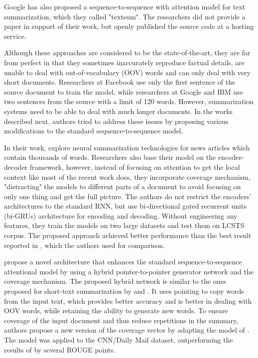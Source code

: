 \documentclass[11pt,a4paper,onecolumn]{article}
\begin{document}
Google has also proposed a sequence-to-sequence with attention model for text summarization, which they called "textsum".
The researchers did not provide a paper in support of their work, but openly published the source code \cite{LiuGoogle2016} at a hosting service.

Although these approaches are considered to be the state-of-the-art, they are far from perfect in that they sometimes inaccurately reproduce factual details, are unable to deal with out-of-vocabulary (OOV) words and can only deal with very short documents.
Researchers at Facebook use only the first sentence of the source document to train the model, while researchers at Google and IBM use two sentences from the source with a limit of 120 words.
However, summarization systems need to be able to deal with much longer documents.
In the works described next, authors tried to address these issues by proposing various modifications to the standard sequence-to-sequence model.

In their work,  explore neural summarization technologies for news articles which contain thousands of words.
Researchers also base their model on the encoder-decoder framework, however, instead of focusing on attention to get the local context like most of the recent work does, they incorporate coverage mechanism, "distracting" the models to different parts of a document to avoid focusing on only one thing and get the full picture.
The authors do not restrict the encoders' architectures to the standard RNN, but use bi-directional gated recurrent units (bi-GRUs) architecture for encoding and decoding.
Without engineering any features, they train the models on two large datasets and test them on LCSTS corpus.
The proposed approach achieved better performance than the best result reported in \cite{hu2015lcsts}, which the authors used for comparison.

 propose a novel architecture that enhances the standard sequence-to-sequence attentional model by using a hybrid pointer-to-pointer generator network and the coverage mechanism.
The proposed hybrid network is similar to the ones proposed for short-text summarization by  and .
It uses pointing \cite{vinyals2015pointer} to copy words from the input text, which provides better accuracy and is better in dealing with OOV words, while retaining the ability to generate new words.
To ensure coverage of the input document and thus reduce repetitions in the summary, authors propose a new version of the coverage vector by adapting the model of .
The model was applied to the CNN/Daily Mail dataset, outperforming the results of  by several ROUGE points.
\end{document}

